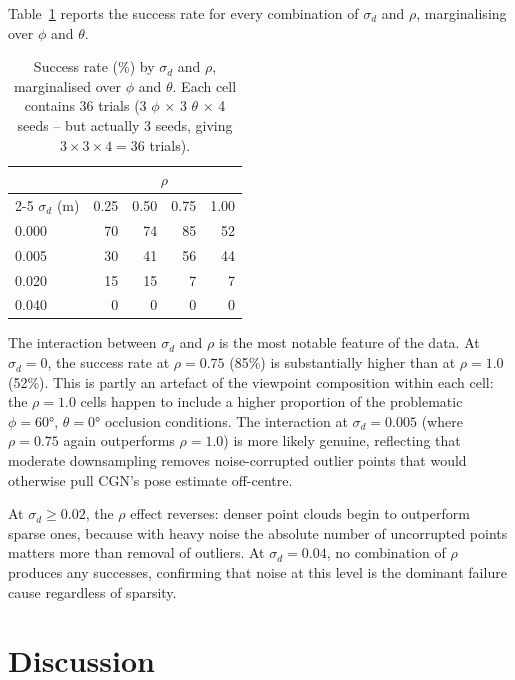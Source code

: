 \documentclass[11pt,a4paper]{report}
\begin{document}
Table~\ref{tab:interaction} reports the success rate for every combination of $\sigma_d$ and $\rho$, marginalising over $\phi$ and $\theta$.

\begin{table}[t]
  \caption{Success rate (\%) by $\sigma_d$ and $\rho$, marginalised over $\phi$ and $\theta$. Each cell contains 36 trials (3 $\phi$ $\times$ 3 $\theta$ $\times$ 4 seeds -- but actually 3 seeds, giving $3 \times 3 \times 4 = 36$ trials).}
  \label{tab:interaction}
  \centering
  \begin{tabular}{lrrrr}
    \toprule
    & \multicolumn{4}{c}{$\rho$} \\
    \cmidrule(lr){2-5}
    $\sigma_d$ (m) & 0.25 & 0.50 & 0.75 & 1.00 \\
    \midrule
    0.000 & 70 & 74 & 85 & 52 \\
    0.005 & 30 & 41 & 56 & 44 \\
    0.020 & 15 & 15 &  7 &  7 \\
    0.040 &  0 &  0 &  0 &  0 \\
    \bottomrule
  \end{tabular}
\end{table}

The interaction between $\sigma_d$ and $\rho$ is the most notable feature of the data. At $\sigma_d = 0$, the success rate at $\rho = 0.75$ (85\%) is substantially higher than at $\rho = 1.0$ (52\%). This is partly an artefact of the viewpoint composition within each cell: the $\rho = 1.0$ cells happen to include a higher proportion of the problematic $\phi = 60°$, $\theta = 0°$ occlusion conditions. The interaction at $\sigma_d = 0.005$ (where $\rho = 0.75$ again outperforms $\rho = 1.0$) is more likely genuine, reflecting that moderate downsampling removes noise-corrupted outlier points that would otherwise pull CGN's pose estimate off-centre.

At $\sigma_d \geq 0.02$, the $\rho$ effect reverses: denser point clouds begin to outperform sparse ones, because with heavy noise the absolute number of uncorrupted points matters more than removal of outliers. At $\sigma_d = 0.04$, no combination of $\rho$ produces any successes, confirming that noise at this level is the dominant failure cause regardless of sparsity.


\chapter{Discussion}
\label{ch:discussion}
\end{document}
